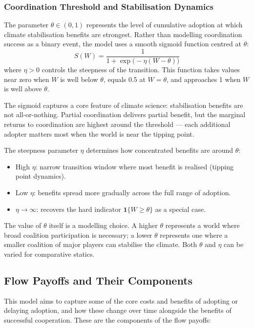 \documentclass[12pt,a4paper]{article}
\begin{document}
\subsubsection{Coordination Threshold and Stabilisation Dynamics}

The parameter $\theta \in (0,1)$ represents the level of cumulative adoption at which climate stabilisation benefits are strongest. Rather than modelling coordination success as a binary event, the model uses a smooth sigmoid function centred at $\theta$:
\[
  S(W) = \frac{1}{1 + \exp\!\bigl(-\eta(W - \theta)\bigr)}
\]
where $\eta > 0$ controls the steepness of the transition. This function takes values near zero when $W$ is well below $\theta$, equals 0.5 at $W = \theta$, and approaches 1 when $W$ is well above $\theta$.

The sigmoid captures a core feature of climate science: stabilisation benefits are not all-or-nothing. Partial coordination delivers partial benefit, but the marginal returns to coordination are highest around the threshold --- each additional adopter matters most when the world is near the tipping point.

The steepness parameter $\eta$ determines how concentrated benefits are around $\theta$:
\begin{itemize}
  \item High $\eta$: narrow transition window where most benefit is realised (tipping point dynamics).
  \item Low $\eta$: benefits spread more gradually across the full range of adoption.
  \item $\eta \to \infty$: recovers the hard indicator $\mathbf{1}\{W \geq \theta\}$ as a special case.
\end{itemize}

The value of $\theta$ itself is a modelling choice. A higher $\theta$ represents a world where broad coalition participation is necessary; a lower $\theta$ represents one where a smaller coalition of major players can stabilise the climate. Both $\theta$ and $\eta$ can be varied for comparative statics.

\subsection{Flow Payoffs and Their Components}

This model aims to capture some of the core costs and benefits of adopting or delaying adoption, and how these change over time alongside the benefits of successful cooperation. These are the components of the flow payoffs:
\end{document}
